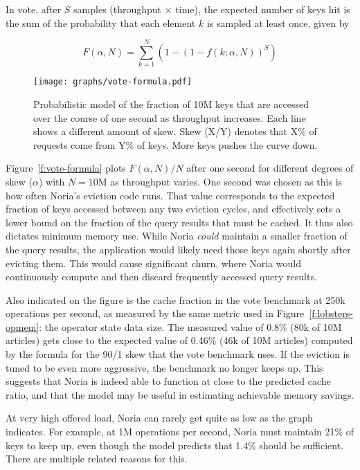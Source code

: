 In vote, after $S$ samples (throughput $\times$ time), the expected number of
keys hit is the sum of the probability that each element $k$ is sampled at least
once, given by

\begin{displaymath}
  F(\alpha,N)={\sum \limits _{k=1}^{N} \left(1 - \left(1 - f(k; \alpha, N)\right)^{S}\right)}
\end{displaymath}

\begin{figure}[h]
  \centering
  \texttt{[image: graphs/vote-formula.pdf]}
  \caption{Probabilistic model of the fraction of 10M keys that are accessed
  over the course of one second as throughput increases. Each line shows a
  different amount of skew. Skew (X/Y) denotes that X\% of requests come from
  Y\% of keys. More keys pushes the curve down.}
  \label{f:vote-formula}
\end{figure}

Figure~\vref{f:vote-formula} plots $F(\alpha, N)/N$ after one second for
different degrees of skew ($\alpha$) with $N=10\text{M}$ as throughput varies.
One second was chosen as this is how often Noria's eviction code runs. That
value corresponds to the expected fraction of keys accessed between any two
eviction cycles, and effectively sets a lower bound on the fraction of the query
results that must be cached. It thus also dictates minimum memory use. While
Noria \emph{could} maintain a smaller fraction of the query results, the
application would likely need those keys again shortly after evicting them. This
would cause significant churn, where Noria would continuously compute and then
discard frequently accessed query results.

Also indicated on the figure is the cache fraction in the vote benchmark at 250k
operations per second, as measured by the same metric used in
Figure~\ref{f:lobsters-opmem}: the operator state data size. The measured value
of 0.8\% (80k of 10M articles) gets close to the expected value of 0.46\% (46k
of 10M articles) computed by the formula for the 90/1 skew that the vote
benchmark uses. If the eviction is tuned to be even more aggressive, the
benchmark no longer keeps up. This suggests that Noria is indeed able to
function at close to the predicted cache ratio, and that the model may be useful
in estimating achievable memory savings.

At very high offered load, Noria can rarely get quite as low as the graph
indicates. For example, at 1M operations per second, Noria must maintain 21\% of
keys to keep up, even though the model predicts that 1.4\% should be sufficient.
There are multiple related reasons for this.

